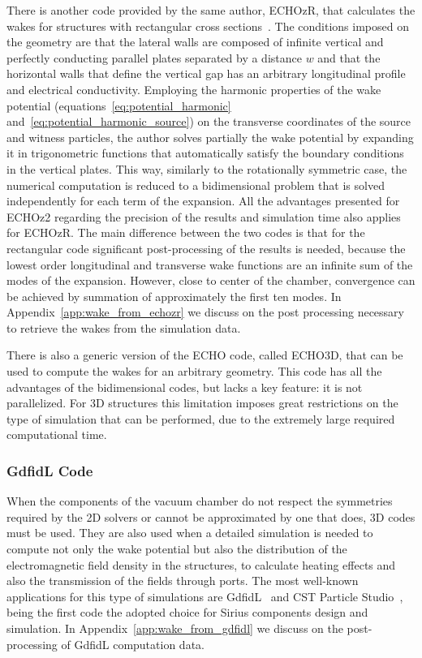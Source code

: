     There is another code provided by the same author, ECHOzR, that calculates the wakes for structures with rectangular cross sections~\cite{Zagorodnov2015}. The conditions imposed on the geometry are that the lateral walls are composed of infinite vertical and perfectly conducting parallel plates separated by a distance $w$ and that the horizontal walls that define the vertical gap has an arbitrary longitudinal profile and electrical conductivity. Employing the harmonic properties of the wake potential (equations~\eqref{eq:potential_harmonic} and~\eqref{eq:potential_harmonic_source}) on the transverse coordinates of the source and witness particles, the author solves partially the wake potential by expanding it in trigonometric functions that automatically satisfy the boundary conditions in the vertical plates. This way, similarly to the rotationally symmetric case, the numerical computation is reduced to a bidimensional problem that is solved independently for each term of the expansion. All the advantages presented for ECHOz2 regarding the precision of the results and simulation time also applies for ECHOzR. The main difference between the two codes is that for the rectangular code significant post-processing of the results is needed, because the lowest order longitudinal and transverse wake functions are an infinite sum of the modes of the expansion. However, close to center of the chamber, convergence can be achieved by summation of approximately the first ten modes. In Appendix~\ref{app:wake_from_echozr} we discuss on the post processing necessary to retrieve the wakes from the simulation data.

    There is also a generic version of the ECHO code, called ECHO3D, that can be used to compute the wakes for an arbitrary geometry. This code has all the advantages of the bidimensional codes, but lacks a key feature: it is not parallelized. For 3D structures this limitation imposes great restrictions on the type of simulation that can be performed, due to the extremely large required computational time.

\subsubsection{GdfidL Code}

    When the components of the vacuum chamber do not respect the symmetries required by the 2D solvers or cannot be approximated by one that does, 3D codes must be used. They are also used when a detailed simulation is needed to compute not only the wake potential but also the distribution of the electromagnetic field density in the structures, to calculate heating effects and also the transmission of the fields through ports. The most well-known applications for this type of simulations are GdfidL~\cite{Bruns1997, Bruns2017} and CST Particle Studio~\cite{CST2017}, being the first code the adopted choice for Sirius components design and simulation. In Appendix~\ref{app:wake_from_gdfidl} we discuss on the post-processing of GdfidL computation data.


